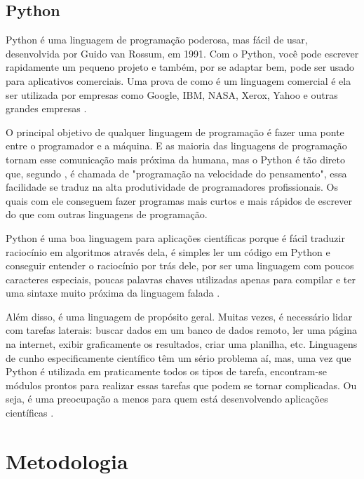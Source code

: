 \section{Python}

Python é uma linguagem de programação poderosa, mas fácil de usar, desenvolvida por Guido van Rossum, em 1991. Com o Python, você pode escrever rapidamente um pequeno projeto e também, por se adaptar bem, pode ser usado para aplicativos comerciais. Uma prova de como é um linguagem comercial é ela ser utilizada por empresas como Google, IBM, NASA, Xerox, Yahoo e outras grandes empresas \cite{dawson2010}.

O principal objetivo de qualquer linguagem de programação é fazer uma ponte entre o programador e a máquina. E as maioria das linguagens de programação tornam esse comunicação mais próxima da humana, mas o Python é tão direto que, segundo \cite{dawson2010}, é chamada de "programação na velocidade do pensamento", essa facilidade se traduz na alta produtividade de programadores profissionais. Os quais com ele conseguem fazer programas mais curtos e mais rápidos de escrever do que com outras linguagens de programação. 

Python é uma boa linguagem para aplicações científicas porque é fácil traduzir raciocínio em algoritmos através dela, é simples ler um código em Python e conseguir entender o raciocínio por trás dele, por ser uma linguagem com poucos caracteres especiais, poucas palavras chaves utilizadas apenas para compilar e ter uma sintaxe muito próxima da linguagem falada \cite{reitz2018}.

Além disso, é uma linguagem de propósito geral. Muitas vezes, é necessário lidar com tarefas laterais: buscar dados em um banco de dados remoto, ler uma página na internet, exibir graficamente os resultados, criar uma planilha, etc. Linguagens de cunho especificamente científico têm um sério problema aí, mas, uma vez que Python é utilizada em praticamente todos os tipos de tarefa, encontram-se módulos prontos para realizar essas tarefas que podem se tornar complicadas. Ou seja, é uma preocupação a menos para quem está desenvolvendo aplicações científicas \cite{downey2012}.
  

\chapter[Metodologia]{Metodologia}

